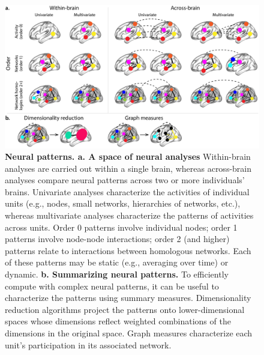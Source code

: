 \documentclass[english]{article}
\begin{document}
\begin{figure}[tp]
  \centering
  \includegraphics[width=\textwidth]{figs/patterns}
  \caption{\textbf{Neural patterns.  a. A space of neural analyses}
    Within-brain analyses are carried out within a single brain,
    whereas across-brain analyses compare neural patterns across two
    or more individuals' brains.  Univariate analyses characterize the
    activities of individual units (e.g., nodes, small networks,
    hierarchies of networks, etc.), whereas multivariate analyses
    characterize the patterns of activities across units.  Order 0
    patterns involve individual nodes; order 1 patterns involve
    node-node interactions; order 2 (and higher) patterns relate to
    interactions between homologous networks.  Each of these patterns
    may be static (e.g., averaging over time) or dynamic.
    \textbf{b. Summarizing neural patterns.}  To efficiently compute
    with complex neural patterns, it can be useful to characterize the
    patterns using summary measures.  Dimensionality reduction
    algorithms project the patterns onto lower-dimensional spaces
    whose dimensions reflect weighted combinations of the dimensions
    in the original space.  Graph measures characterize each unit's
    participation in its associated network.}
  \label{fig:patterns}
\end{figure}
\end{document}
